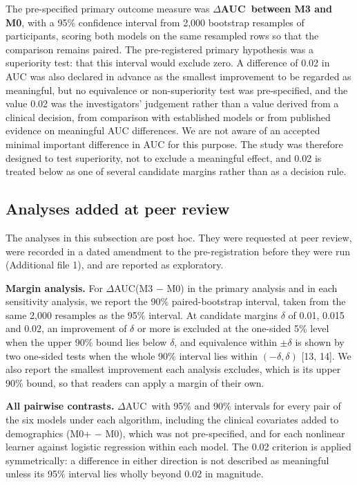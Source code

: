 \documentclass[12pt]{article}
\newcommand{\deltaauc}{$\Delta$AUC}
\begin{document}
The pre-specified primary outcome measure was \textbf{\deltaauc\ between M3 and M0}, with a 95\% confidence interval from 2,000 bootstrap resamples of participants, scoring both models on the same resampled rows so that the comparison remains paired. The pre-registered primary hypothesis was a superiority test: that this interval would exclude zero. A difference of 0.02 in AUC was also declared in advance as the smallest improvement to be regarded as meaningful, but no equivalence or non-superiority test was pre-specified, and the value 0.02 was the investigators' judgement rather than a value derived from a clinical decision, from comparison with established models or from published evidence on meaningful AUC differences. We are not aware of an accepted minimal important difference in AUC for this purpose. The study was therefore designed to test superiority, not to exclude a meaningful effect, and 0.02 is treated below as one of several candidate margins rather than as a decision rule.

\subsection*{Analyses added at peer review}

The analyses in this subsection are post hoc. They were requested at peer review, were recorded in a dated amendment to the pre-registration before they were run (Additional file 1), and are reported as exploratory.

\textbf{Margin analysis.} For \deltaauc(M3 $-$ M0) in the primary analysis and in each sensitivity analysis, we report the 90\% paired-bootstrap interval, taken from the same 2,000 resamples as the 95\% interval. At candidate margins $\delta$ of 0.01, 0.015 and 0.02, an improvement of $\delta$ or more is excluded at the one-sided 5\% level when the upper 90\% bound lies below $\delta$, and equivalence within $\pm\delta$ is shown by two one-sided tests when the whole 90\% interval lies within $(-\delta, \delta)$ [13, 14]. We also report the smallest improvement each analysis excludes, which is its upper 90\% bound, so that readers can apply a margin of their own.

\textbf{All pairwise contrasts.} \deltaauc\ with 95\% and 90\% intervals for every pair of the six models under each algorithm, including the clinical covariates added to demographics (M0+ $-$ M0), which was not pre-specified, and for each nonlinear learner against logistic regression within each model. The 0.02 criterion is applied symmetrically: a difference in either direction is not described as meaningful unless its 95\% interval lies wholly beyond 0.02 in magnitude.
\end{document}
